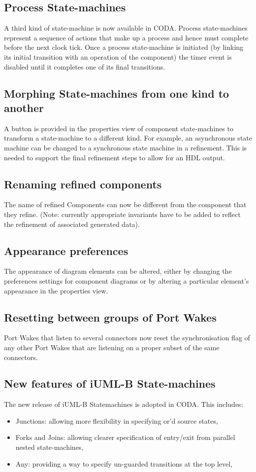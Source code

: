 \subsection{Process State-machines}
A third kind of state-machine is now available in CODA. Process state-machines represent a sequence of actions that make up a process and hence must complete before the next clock tick. Once a process state-machine is initiated (by linking its initial transition with an operation of the component) the timer event is disabled until it completes one of its final transitions.

\subsection{Morphing State-machines from one kind to another}
A button is provided in the properties view of component state-machines to transform a state-machine to a different kind. For example, an asynchronous state machine can be changed to a synchronous state machine in a refinement. This is needed to support the final refinement steps to allow for an HDL output.

\subsection{Renaming refined components}
The name of refined Components can now be different from the component that they refine. (Note: currently appropriate invariants have to be added to reflect the refinement of associated generated data).

\subsection{Appearance preferences}
The appearance of diagram elements can be altered, either by changing the preferences settings for component diagrams or by altering a particular element's appearance in the properties view.

\subsection{Resetting between groups of Port Wakes}
Port Wakes that listen to several connectors now reset the synchronisation flag of any other Port Wakes that are listening on a proper subset of the same connectors. 

\subsection{New features of iUML-B State-machines}
The new release of iUML-B Statemachines is adopted in CODA. This includes:\begin{itemize}
\item Junctions: allowing more flexibility in specifying or'd source states,\item Forks and Joins: allowing clearer specification of entry/exit from parallel nested state-machines, \item Any: providing a way to specify un-guarded transitions at the top level, 
\end{itemize}
